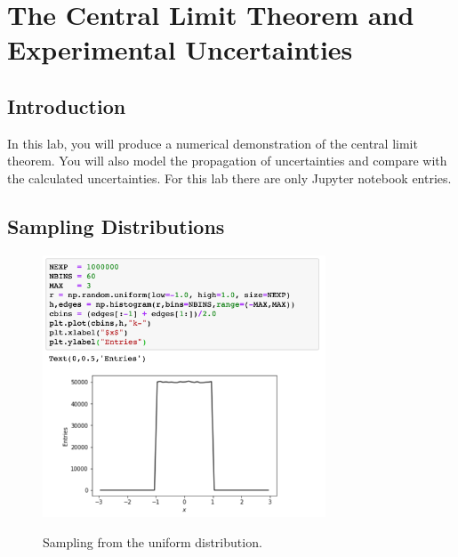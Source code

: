 \chapter{The Central Limit Theorem and Experimental Uncertainties}

%
%

\section{Introduction}

In this lab, you will produce a numerical demonstration of the central
limit theorem.  You will also model the propagation of uncertainties
and compare with the calculated uncertainties. For this lab there are
only Jupyter notebook entries.

\section{Sampling Distributions}

\begin{figure}[htbp]
\begin{center}
\includegraphics[width=0.75\textwidth]{figs/labs/uncertainties/step.png}\\
\end{center}
\caption{\label{fig:samplingstep} Sampling from the uniform distribution. }
\end{figure}

